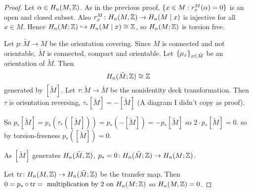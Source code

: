 \documentclass[language=english]{TemplateLecture}
\begin{document}
\begin{proof}
    Let \(\alpha \in H_n(M, \mathbb{Z})\). As in the previous proof,
    \(\{x \in M : r_x^M(\alpha) = 0\}\) is an open and closed subset. Also \(r_x^M\colon H_n(M, \mathbb{Z}) \to H_n(M \mid x)\) is injective for all \(x \in M\). Hence \(H_n(M; \mathbb{Z}) \hookrightarrow H_n(M \mid x) \cong \mathbb{Z}\), so \(H_n(M; \mathbb{Z})\) is torsion free.

    Let \(p\colon \tilde M \to M\) be the orientation covering. Since \(M\) is connected and not orientable, \(\tilde M\) is connected, compact and orientable. Let \(\{\mu_x\}_{x \in \tilde M}\) be an orientation of \(\tilde M\). Then
    \[H_n(\tilde M; \mathbb{Z}) \cong \mathbb{Z}\]
    generated by \([\tilde M]\). Let \(\tau\colon \tilde M \to \tilde M\) be the nonidentity deck transformation. Then \(\tau\) is orientation reversing, \(\tau_*[\tilde M] = - [\tilde M]\) (A diagram I didn't copy as proof).

    So \(p_*[\tilde M] = p_*(\tau_*([\tilde M])) = p_*(- [\tilde M]) = - p_* [\tilde M]\) so \(2 \cdot p_*[\tilde M] = 0\). so by torsion-freeness \(p_*([\tilde M]) = 0\).

    As \([\tilde M]\) generates \(H_n(\tilde M, \mathbb{Z})\), \(p_* = 0\colon H_n(\tilde M; \mathbb{Z}) \to H_n(M; \mathbb{Z})\).

    Let \(\mathrm{tr}\colon H_n(M, \mathbb{Z}) \to H_n(\tilde M; \mathbb{Z})\) be the transfer map. Then \(0 = p_* \circ \mathrm{tr} = \text{ multiplication by 2 on } H_n(M; \mathbb{Z}) \) so \(H_n(M, \mathbb{Z}) = 0\).
\end{proof}
\end{document}
